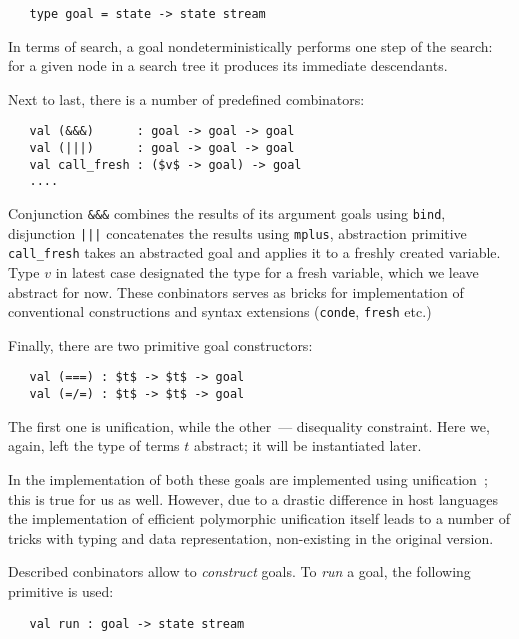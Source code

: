 \begin{lstlisting}
   type goal = state -> state stream
\end{lstlisting}

In terms of search, a goal nondeterministically performs one step of the search: for a given
node in a search tree it produces its immediate descendants.

Next to last, there is a number of predefined combinators:

\begin{lstlisting}
   val (&&&)      : goal -> goal -> goal
   val (|||)      : goal -> goal -> goal
   val call_fresh : ($v$ -> goal) -> goal
   ....
\end{lstlisting}

Conjunction \lstinline{&&&} combines the results of its argument goals using \lstinline{bind}, 
disjunction \lstinline{|||} concatenates the results using \lstinline{mplus}, abstraction
primitive \lstinline{call_fresh} takes an abstracted goal and applies it to a freshly created
variable. Type $v$ in latest case designated the type for a fresh variable, which we leave
abstract for now. These conbinators serves as bricks for implementation of conventional 
\miniKanren constructions and syntax extensions (\lstinline{conde}, \lstinline{fresh} etc.)

Finally, there are two primitive goal constructors:

\begin{lstlisting}
   val (===) : $t$ -> $t$ -> goal
   val (=/=) : $t$ -> $t$ -> goal
\end{lstlisting}

The first one is unification, while the other~--- disequality constraint. Here we, again, left 
the type of terms $t$ abstract; it will be instantiated later.

In the implementation of \miniKanren both these goals are implemented using unification~\cite{CKanren}; this
is true for us as well. However, due to a drastic difference in host languages the implementation of
efficient polymorphic unification itself leads to a number of tricks with typing and data representation,
non-existing in the original version.

Described conbinators allow to \emph{construct} goals. To \emph{run} a goal, the following
primitive is used:

\begin{lstlisting}
   val run : goal -> state stream
\end{lstlisting}

